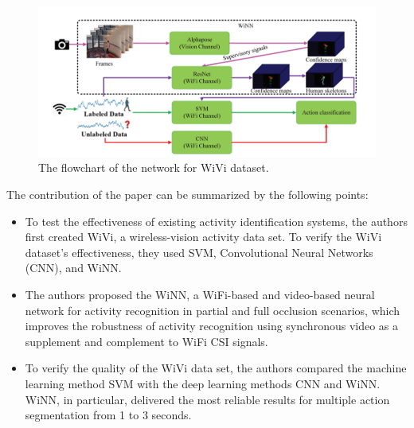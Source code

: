 \begin{figure}[H]
\centering
\includegraphics[width=1\textwidth]{./figure/chap 2/6.png}
\caption{The flowchart of the network for WiVi dataset.}
\label{Fig 2.6}
\end{figure}

The contribution of the paper can be summarized by the following points:

\begin{itemize}
    \item To test the effectiveness of existing activity identification systems, the authors first created WiVi, a wireless-vision activity data set. To verify the WiVi dataset's effectiveness, they used SVM, Convolutional Neural Networks (CNN), and WiNN.
    \item The authors proposed the WiNN, a WiFi-based and video-based neural network for activity recognition in partial and full occlusion scenarios, which improves the robustness of activity recognition using synchronous video as a supplement and complement to WiFi CSI signals.
    \item To verify the quality of the WiVi data set, the authors compared the machine learning method SVM with the deep learning methods CNN and WiNN. WiNN, in particular, delivered the most reliable results for multiple action segmentation from 1 to 3 seconds.
\end{itemize}

